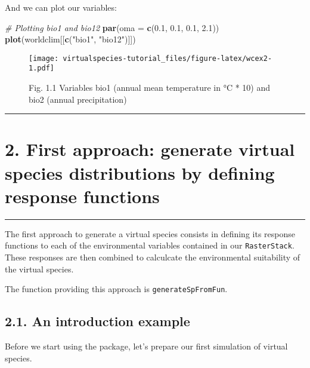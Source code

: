 \documentclass[]{article}
\newenvironment{Shaded}{\begin{snugshade}}{\end{snugshade}}
\newcommand{\KeywordTok}[1]{\textcolor[rgb]{0.13,0.29,0.53}{\textbf{#1}}}
\newcommand{\DataTypeTok}[1]{\textcolor[rgb]{0.13,0.29,0.53}{#1}}
\newcommand{\FloatTok}[1]{\textcolor[rgb]{0.00,0.00,0.81}{#1}}
\newcommand{\StringTok}[1]{\textcolor[rgb]{0.31,0.60,0.02}{#1}}
\newcommand{\CommentTok}[1]{\textcolor[rgb]{0.56,0.35,0.01}{\textit{#1}}}
\newcommand{\NormalTok}[1]{#1}
\begin{document}
And we can plot our variables:

\begin{Shaded}
\begin{Highlighting}[]
\CommentTok{# Plotting bio1 and bio12}
\KeywordTok{par}\NormalTok{(}\DataTypeTok{oma =} \KeywordTok{c}\NormalTok{(}\FloatTok{0.1}\NormalTok{, }\FloatTok{0.1}\NormalTok{, }\FloatTok{0.1}\NormalTok{, }\FloatTok{2.1}\NormalTok{))}
\KeywordTok{plot}\NormalTok{(worldclim[[}\KeywordTok{c}\NormalTok{(}\StringTok{"bio1"}\NormalTok{, }\StringTok{"bio12"}\NormalTok{)]])}
\end{Highlighting}
\end{Shaded}

\begin{figure}
\centering
\texttt{[image: virtualspecies-tutorial\_files/figure-latex/wcex2-1.pdf]}
\caption{Fig. 1.1 Variables bio1 (annual mean temperature in °C * 10)
and bio2 (annual precipitation)}
\end{figure}

\begin{center}\rule{0.5\linewidth}{\linethickness}\end{center}

\section{2. First approach: generate virtual species distributions by
defining response
functions}\label{first-approach-generate-virtual-species-distributions-by-defining-response-functions}

\begin{center}\rule{0.5\linewidth}{\linethickness}\end{center}

\setcounter{section}{2} \setcounter{figure}{0}

The first approach to generate a virtual species consists in defining
its response functions to each of the environmental variables contained
in our \texttt{RasterStack}. These responses are then combined to
calculcate the environmental suitability of the virtual species.

The function providing this approach is \texttt{generateSpFromFun}.

\subsection{2.1. An introduction example}\label{an-introduction-example}

Before we start using the package, let's prepare our first simulation of
virtual species.
\end{document}
